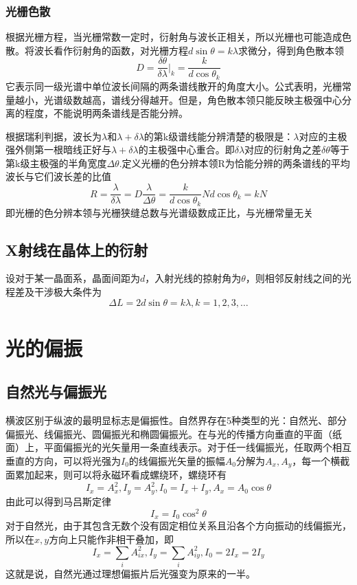 \subsubsection{光栅色散}
根据光栅方程，当光栅常数一定时，衍射角与波长正相关，所以光栅也可能造成色散。将波长看作衍射角的函数，对光栅方程$d\sin \theta=k \lambda$求微分，得到角色散本领
\begin{equation}
    D=\dfrac{\delta \theta}{\delta \lambda}|_k=\dfrac{k}{d \cos \theta_k}
\end{equation}
它表示同一级光谱中单位波长间隔的两条谱线散开的角度大小。公式表明，光栅常量越小，光谱级数越高，谱线分得越开。但是，角色散本领只能反映主极强中心分离的程度，不能说明两条谱线是否能分辨。

根据瑞利判据，波长为$\lambda$和$\lambda+\delta \lambda$的第k级谱线能分辨清楚的极限是：$\lambda$对应的主极强外侧第一根暗线正好与$\lambda+\delta \lambda$的主极强中心重合。即$\delta \lambda$对应的衍射角之差$\delta \theta$等于第k级主极强的半角宽度$\Delta \theta$.定义光栅的色分辨本领R为恰能分辨的两条谱线的平均波长与它们波长差的比值
\begin{equation}
    R=\dfrac{\lambda}{\delta \lambda}=D\dfrac{\lambda}{\Delta \theta}=\dfrac{k}{d \cos \theta_k}Nd\cos \theta_k =kN
\end{equation}
即光栅的色分辨本领与光栅狭缝总数与光谱级数成正比，与光栅常量无关
\subsection{X射线在晶体上的衍射}
 设对于某一晶面系，晶面间距为$d$，入射光线的掠射角为$\theta$，则相邻反射线之间的光程差及干涉极大条件为
\begin{equation}
    \Delta L = 2d \sin \theta =k \lambda ,k=1,2,3,\dots
\end{equation}
\section{光的偏振}
\subsection{自然光与偏振光}
横波区别于纵波的最明显标志是偏振性。自然界存在5种类型的光：自然光、部分偏振光、线偏振光、圆偏振光和椭圆偏振光。在与光的传播方向垂直的平面（纸面）上，平面偏振光的光矢量用一条直线表示。对于任一线偏振光，任取两个相互垂直的方向，可以将光强为$I_0$的线偏振光矢量的振幅$A_0$分解为$A_x,A_y$，每一个横截面累加起来，则可以将永磁环看成螺绕环，螺绕环有\begin{equation}
    I_x=A_x^2,I_y=A_y^2,I_0=I_x+I_y,A_x=A_0 \cos \theta
\end{equation}
由此可以得到马吕斯定律
\begin{equation}
    I_x=I_0 \cos ^2 \theta
\end{equation}
对于自然光，由于其包含无数个没有固定相位关系且沿各个方向振动的线偏振光，所以在$x,y$方向上只能作非相干叠加，即
\begin{equation}
    I_x=\sum_i A_{ix}^2 , I_y=\sum_i A_{iy}^2 , I_0=2I_x=2I_y
\end{equation}
这就是说，自然光通过理想偏振片后光强变为原来的一半。

